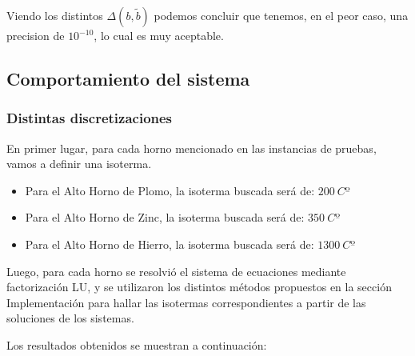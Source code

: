 Viendo los distintos $\Delta(b, \tilde{b})$ podemos concluir que tenemos, en el peor caso, una precision de $10^{-10}$, lo cual es muy aceptable.

\subsection{Comportamiento del sistema}

\subsubsection{Distintas discretizaciones}

En primer lugar, para cada horno mencionado en las instancias de pruebas, vamos a definir una isoterma.
\begin{itemize}
    \item Para el Alto Horno de Plomo, la isoterma buscada será de: $200\ Cº$
    \item Para el Alto Horno de Zinc, la isoterma buscada será de: $350\ Cº$
    \item Para el Alto Horno de Hierro, la isoterma buscada será de: $1300\ Cº$
\end{itemize}

Luego, para cada horno se resolvió el sistema de ecuaciones mediante factorización LU, y se utilizaron los distintos métodos propuestos en la sección Implementación para hallar las isotermas correspondientes a partir de las soluciones de los sistemas.

Los resultados obtenidos se muestran a continuación:

